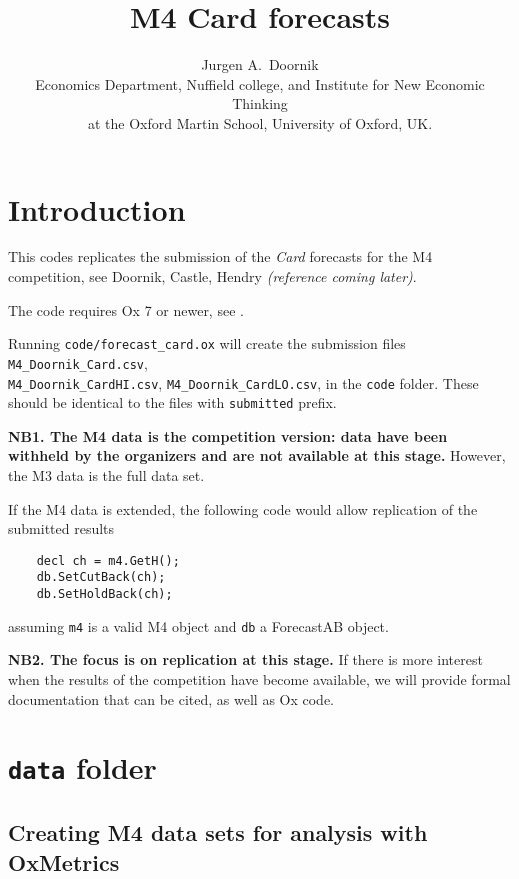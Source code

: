 \documentclass[11pt,a4paper]{article}
\def\cite{\citeN}%
\begin{document}
\title{M4 Card forecasts}

\author{Jurgen A.\ Doornik \\
Economics Department, Nuffield college, and Institute for New Economic Thinking\\
at the Oxford Martin School, University of Oxford, UK.}
\maketitle

\vspace{2ex}


\section{Introduction}

This codes replicates the submission of the \textit{Card} forecasts for the M4 competition,
see Doornik, Castle, Hendry \textit{(reference coming later)}.

The code requires Ox 7 or newer, see \cite{Ox}.

Running \texttt{code/forecast\_card.ox} will create the submission files
\texttt{M4\_Doornik\_Card.csv},\\
\texttt{M4\_Doornik\_CardHI.csv}, \texttt{M4\_Doornik\_CardLO.csv}, in
the \texttt{code} folder. These should be identical to the files with \texttt{submitted} prefix.

\textbf{NB1. The M4 data is the competition version: data have been withheld by the organizers
and are not available at this stage.} However, the M3 data is the full data set.

If the M4 data is extended, the following code would allow replication of the submitted results
\begin{verbatim}
    decl ch = m4.GetH();
    db.SetCutBack(ch);
    db.SetHoldBack(ch);
\end{verbatim}
assuming \texttt{m4} is a valid M4 object and \texttt{db} a ForecastAB object.

\textbf{NB2. The focus is on replication at this stage.} If there is more interest when the results
of the competition have become available, we will provide formal documentation that can be cited, as well as Ox code.


\section{\texttt{data} folder}

\subsection{Creating M4 data sets for analysis with OxMetrics}
\label{se:data}
\end{document}
